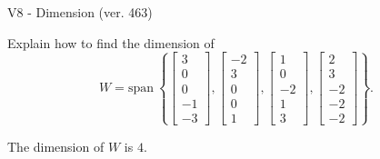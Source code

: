 \begin{exercise}
  \begin{exerciseTitle}V8 - Dimension (ver. 463)\end{exerciseTitle}
  \begin{exerciseStatement}
    Explain how to find the dimension of 
\[W=\mathrm{span}\ \left\{\left[\begin{array}{r}
3 \\
0 \\
0 \\
-1 \\
-3
\end{array}\right] , \left[\begin{array}{r}
-2 \\
3 \\
0 \\
0 \\
1
\end{array}\right] , \left[\begin{array}{r}
1 \\
0 \\
-2 \\
1 \\
3
\end{array}\right] , \left[\begin{array}{r}
2 \\
3 \\
-2 \\
-2 \\
-2
\end{array}\right]\right\}.\]



  \end{exerciseStatement}
  \begin{exerciseAnswer}
   The dimension of \(W\) is  \(4\).
  


  \end{exerciseAnswer}
\end{exercise}